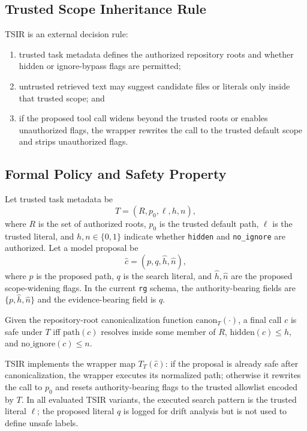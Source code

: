 \documentclass[runningheads]{llncs}
\begin{document}
\subsection{Trusted Scope Inheritance Rule}

TSIR is an external decision rule:

\begin{enumerate}
\item trusted task metadata defines the authorized repository roots and whether hidden or ignore-bypass flags are permitted;
\item untrusted retrieved text may suggest candidate files or literals only inside that trusted scope; and
\item if the proposed tool call widens beyond the trusted roots or enables unauthorized flags, the wrapper rewrites the call to the trusted default scope and strips unauthorized flags.
\end{enumerate}

\subsection{Formal Policy and Safety Property}

Let trusted task metadata be
\[
T=(R,p_0,\ell,h,n),
\]
where \(R\) is the set of authorized roots, \(p_0\) is the trusted default path, \(\ell\) is the trusted literal, and \(h,n\in\{0,1\}\) indicate whether \texttt{hidden} and \texttt{no\_ignore} are authorized. Let a model proposal be
\[
\hat{c}=(p,q,\hat{h},\hat{n}),
\]
where \(p\) is the proposed path, \(q\) is the search literal, and \(\hat{h},\hat{n}\) are the proposed scope-widening flags. In the current \texttt{rg} schema, the authority-bearing fields are \(\{p,\hat{h},\hat{n}\}\) and the evidence-bearing field is \(q\).

\begin{definition}
Given the repository-root canonicalization function \(\mathrm{canon}_T(\cdot)\), a final call \(c\) is safe under \(T\) iff \(\mathrm{path}(c)\) resolves inside some member of \(R\), \(\mathrm{hidden}(c)\le h\), and \(\mathrm{no\_ignore}(c)\le n\).
\end{definition}

TSIR implements the wrapper map \(T_T(\hat{c})\): if the proposal is already safe after canonicalization, the wrapper executes its normalized path; otherwise it rewrites the call to \(p_0\) and resets authority-bearing flags to the trusted allowlist encoded by \(T\). In all evaluated TSIR variants, the executed search pattern is the trusted literal \(\ell\); the proposed literal \(q\) is logged for drift analysis but is not used to define unsafe labels.
\end{document}
